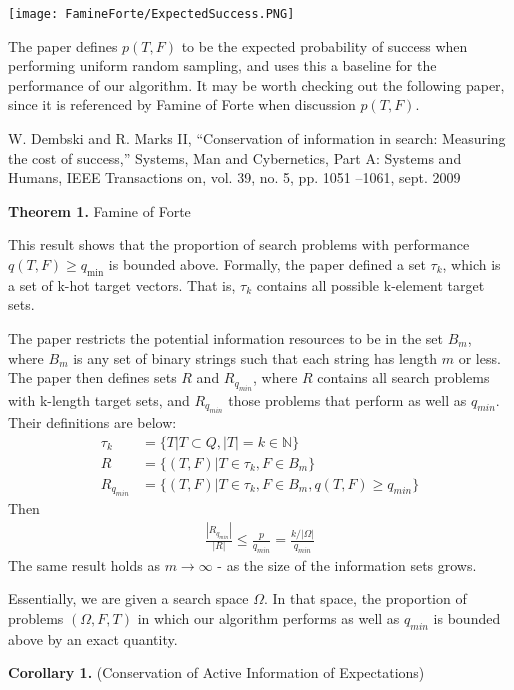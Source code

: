 \documentclass[12pt]{article}
\begin{document}
\begin{center}
    \texttt{[image: FamineForte/ExpectedSuccess.PNG]}
\end{center}

The paper defines $p(T,F)$ to be the expected probability of success when performing uniform random sampling, and uses this a baseline for the performance of our algorithm. It may be worth checking out the following paper, since it is referenced by Famine of Forte when discussion $p(T,F)$. 


W. Dembski and R. Marks II, “Conservation of information in search:
Measuring the cost of success,” Systems, Man and Cybernetics, Part A:
Systems and Humans, IEEE Transactions on, vol. 39, no. 5, pp. 1051
–1061, sept. 2009

\textbf{Theorem 1.} Famine of Forte

This result shows that the proportion of search problems with performance $q(T,F) \geq q_{\text{min}}$ is bounded above. Formally, the paper defined a set $\tau_k$, which is a set of k-hot target vectors. That is, $\tau_k$ contains all possible k-element target sets. 

The paper restricts the potential information resources to be in the set $B_m$, where $B_m$ is any set of binary strings such that each string has length $m$ or less. The paper then defines sets $R$ and $R_{q_{min}}$, where $R$ contains all search problems with k-length target sets, and $R_{q_{min}}$ those problems that perform as well as $q_{min}$. Their definitions are below: 
\begin{align*}
    \tau_k &= \{T | T \subset Q, |T| = k \in \mathds{N}\} \\ 
    R &= \{(T,F) | T \in \tau_k, F \in B_m\} \\
    R_{q_{min}} &= \{(T,F) | T \in \tau_k, F \in B_m, q(T,F) \geq q_{min}\}
\end{align*}
Then 
\begin{align*}
    \frac{|R_{q_{min}}|}{|R|} \leq \frac{p}{q_{min}} = \frac{k / |\Omega|}{q_{min}}
\end{align*}
The same result holds as $m \to \infty$ - as the size of the information sets grows.

Essentially, we are given a search space $\Omega$. In that space, the proportion of problems $(\Omega, F, T)$ in which our algorithm performs as well as $q_{min}$ is bounded above by an exact quantity. 

\bigskip 

\textbf{Corollary 1.} (Conservation of Active Information of Expectations)
\end{document}
